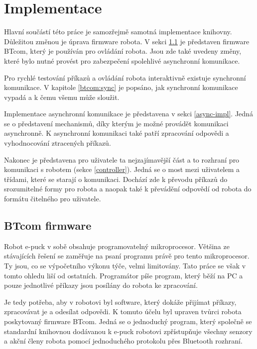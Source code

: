\chapter{Implementace}
\label{Implementace}

    Hlavní součástí této práce je samozřejmě samotná implementace knihovny.
    Důležitou změnou je úprava firmware robota. V sekci \ref{btcom} je
    představen firmware BTcom, který je používán pro ovládání robota. Jsou zde
    také uvedeny změny, které bylo nutné provést pro zabezpečení spolehlivé
    asynchronní komunikace.

    Pro rychlé testování příkazů a ovládání robota interaktivně existuje
    synchronní komunikace. V kapitole \ref{btcom:sync} je popsáno, jak
    synchronní komunikace vypadá a k čemu všemu může sloužit.

    Implementace asynchronní komunikace je představena v sekci
    \ref{async-impl}. Jedná se o představení mechanismů, díky kterým je možné
    provádět komunikaci asynchronně. K asynchronní komunikaci také patří
    zpracování odpovědi a vyhodnocování ztracených příkazů.

    Nakonec je představena pro uživatele ta nejzajímavější část a to rozhraní
    pro komunikaci s robotem (sekce \ref{controller}). Jedná se o most mezi
    uživatelem a třídami, které se starají o komunikaci. Dochází zde k převodu
    příkazů do srozumitelné formy pro robota a naopak také k převádění odpovědí
    od robota do formátu čitelného pro uživatele.

    \section{BTcom firmware}
    \label{btcom}

    Robot e-puck v sobě obsahuje programovatelný mikroprocesor. Většina ze
    stávajících řešení se zaměřuje na psaní programu právě pro tento
    mikroprocesor. Ty jsou, co se výpočetního výkonu týče, velmi limitovány.
    Tato práce se však v tomto ohledu liší od ostatních. Programátor píše
    program, který běží na PC a pouze jednotlivé příkazy jsou posílány do
    robota ke zpracování.

    Je tedy potřeba, aby v robotovi byl software, který dokáže přijímat
    příkazy, zpracovávat je a odesílat odpovědi. K tomuto účelu byl upraven
    tvůrci robota poskytovaný firmware BTcom. Jedná se o jednoduchý program,
    který společně se standardní knihovnou dodávanou k e-puck robotovi
    zpřístupňuje všechny senzory a akční členy robota pomocí jednoduchého
    protokolu přes Bluetooth rozhraní.

